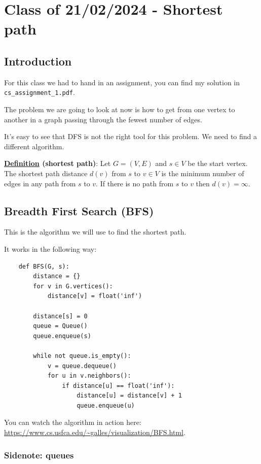 \documentclass[10pt]{extarticle}
\begin{document}
\section{Class of 21/02/2024 - Shortest path}

\subsection{Introduction}

For this class we had to hand in an assignment,
you can find my solution in \texttt{cs\_assignment\_1.pdf}.

The problem we are going to look at now is how to get from one vertex to another in a graph passing through the fewest number of edges.

It's easy to see that DFS is not the right tool for this problem. We need to find a different algorithm.

\textbf{\underline{Definition} (shortest path)}:
Let $G = (V, E)$ and $s \in V$ be the start vertex.
The shortest path distance $d(v)$ from $s$ to $v \in V$ is the minimum number of edges in any path from $s$ to $v$.
If there is no path from $s$ to $v$ then $d(v) = \infty$.

\subsection{Breadth First Search (BFS)}

This is the algorithm we will use to find the shortest path.

It works in the following way:

\begin{verbatim}
    def BFS(G, s):
        distance = {}
        for v in G.vertices():
            distance[v] = float('inf')

        distance[s] = 0
        queue = Queue()
        queue.enqueue(s)

        while not queue.is_empty():
            v = queue.dequeue()
            for u in v.neighbors():
                if distance[u] == float('inf'):
                    distance[u] = distance[v] + 1
                    queue.enqueue(u)
\end{verbatim}

You can watch the algorithm in action here: \url{https://www.cs.usfca.edu/~galles/visualization/BFS.html}.

\subsubsection{Sidenote: queues}
\end{document}
